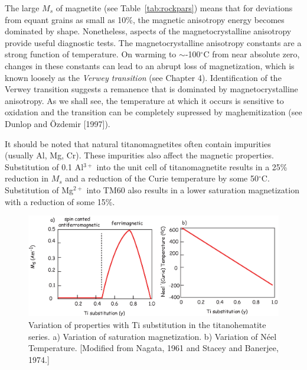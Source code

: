 The large $M_s$ of magnetite (see Table~\ref{tab:rockpars}) means that
for deviations from equant grains as small as 10\%, 
%
the magnetic anisotropy energy becomes dominated by shape. 
Nonetheless, aspects of the
%
magnetocrystalline anisotropy provide useful diagnostic tests.  The
magnetocrystalline anisotropy constants are a strong function of
temperature. On warming to $\sim$-100$^{\circ}$C from
near absolute zero, changes in
these constants can lead to an abrupt loss of magnetization, which is
known loosely as the 
%
{\it Verwey transition} (see Chapter 4).  Identification of the Verwey
transition suggests a remanence that is dominated by magnetocrystalline
anisotropy.  As we shall see, 
the temperature at which it occurs is sensitive to oxidation and the
transition can be
completely supressed by maghemitization (see 
Dunlop and \"Ozdemir [1997]). 

It should be noted that natural titanomagnetites often contain impurities (usually Al, Mg, Cr).  These impurities also affect the magnetic properties.   Substitution of 0.1 Al$^{3+}$ into the unit cell of titanomagnetite results in a 25\% reduction in $M_s$ and a reduction of the Curie temperature by some 50$^{\circ}$C.  Substitution of Mg$^{2+}$ into TM60 also results in a lower saturation magnetization with a reduction of some 15\%. 

\begin{figure}
\centering  \includegraphics[width=14 cm]{EPSfiles/hemY.eps}
\caption{Variation of properties with Ti substitution in the titanohematite series.  a) Variation of saturation magnetization.  b) Variation of N\'eel Temperature.  [Modified from Nagata, 1961 and Stacey and Banerjee, 1974.]}
\label{fig:hemY}
\end{figure}
\nocite{nagata61,stacey74}



